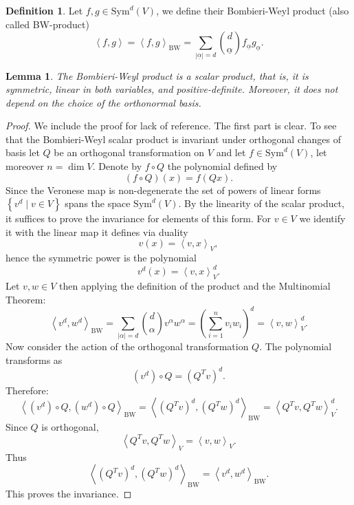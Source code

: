 \documentclass[11pt]{article}
\numberwithin{equation}{section}
\numberwithin{figure}{section}
\theoremstyle{plain}
\newtheorem{lem}[thm]{Lemma}
\theoremstyle{definition}
\newtheorem{defn}[thm]{Definition}
\theoremstyle{remark}
\newcommand{\ga}{\alpha}
\begin{document}
\begin{defn}
Let $f,g\in\mathrm{Sym}^{d}\left( V \right)$, we define their
Bombieri-Weyl product (also called BW-product)
\[
\left\langle f,g \right\rangle
=
\left\langle f,g \right\rangle_{\mathrm{BW}}
=
\sum_{\left| \underline{\ga} \right|=d}
\binom{d}{\underline{\ga}}
f_{\underline{\ga}} g_{\underline{\ga}}.
\]
\end{defn}

\begin{lem}
\label{lem:BWInnerProductIndependent}
The Bombieri-Weyl product is a scalar product, that is, it is
symmetric, linear in both variables, and positive-definite.
Moreover, it does not depend on the choice of the orthonormal basis.
\end{lem}

\begin{proof}
We include the proof for lack of reference. The first part is clear. To see that the Bombieri-Weyl scalar product
is invariant under orthogonal changes of basis let $Q$ be an
orthogonal transformation on $V$ and let
$f\in\mathrm{Sym}^{d}\left( V \right)$,
let moreover $n=\dim V$. Denote by $f\circ Q$ the polynomial defined
by
\[
\left( f\circ Q \right)\left( x \right)
=
f\left( Qx \right).
\]
Since the Veronese map is non-degenerate the set of powers of linear
forms $\left\{ v^{d}\mid v\in V \right\}$ spans the space
$\mathrm{Sym}^{d}\left( V \right)$. By the linearity of the scalar
product, it suffices to prove the invariance for elements of this
form. For $v\in V$ we identify it with the linear map it defines via
duality
\[
v\left( x \right)
=
\left\langle v,x \right\rangle_{V},
\]
hence the symmetric power is the polynomial
\[
v^{d}\left( x \right)
=
\left\langle v,x \right\rangle_{V}^{d}.
\]
Let $v,w\in V$ then applying the definition of the product and the
Multinomial Theorem:
\begin{equation}
\left\langle v^{d},w^{d} \right\rangle_{\mathrm{BW}}
=
\sum_{\left| \alpha \right|=d}
\binom{d}{\alpha}
v^{\alpha} w^{\alpha}
=
\left( \sum_{i=1}^{n} v_{i} w_{i} \right)^{d}
=
\left\langle v,w \right\rangle_{V}^{d}.
\label{eq:CompatibilityBWInnerProduct}
\end{equation}
Now consider the action of the orthogonal transformation $Q$. The
polynomial transforms as
\[
\left( v^{d} \right)\circ Q
=
\left( Q^{T}v \right)^{d}.
\]
Therefore:
\[
\left\langle
\left( v^{d} \right)\circ Q,
\left( w^{d} \right)\circ Q
\right\rangle_{\mathrm{BW}}
=
\left\langle
\left( Q^{T}v \right)^{d},
\left( Q^{T}w \right)^{d}
\right\rangle_{\mathrm{BW}}
=
\left\langle Q^{T}v,Q^{T}w \right\rangle_{V}^{d}.
\]
Since $Q$ is orthogonal,
\[
\left\langle Q^{T}v,Q^{T}w \right\rangle_{V}
=
\left\langle v,w \right\rangle_{V}.
\]
Thus
\[
\left\langle
\left( Q^{T}v \right)^{d},
\left( Q^{T}w \right)^{d}
\right\rangle_{\mathrm{BW}}
=
\left\langle v^{d},w^{d} \right\rangle_{\mathrm{BW}}.
\]
This proves the invariance.
\end{proof}
\end{document}
